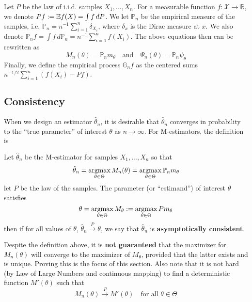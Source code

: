 \documentclass{article}
\begin{document}
Let $P$ be the law of i.i.d. samples $X_1, ..., X_n$. For a measurable function $f: \mathcal{X} \to \mathbb{R}$, we denote $Pf := \mathbb{E} f(X) = \int f\, dP$. We let $\mathbb{P}_n$ be the empirical measure of the samples, i.e. $\mathbb{P}_n = n^{-1} \sum_{i=1}^{n} \delta_{X_i}$, where $\delta_x$ is the Dirac measure at $x$. We also denote $\mathbb{P}_n f = \int f\, d\mathbb{P}_n = n^{-1} \sum_{i=1}^{n} f(X_i)$. The above equations then can be rewritten as 
\begin{equation}
    M_n(\theta) = \mathbb{P}_n m_\theta \quad \text{and} \quad \Psi_n(\theta) = \mathbb{P}_n \psi_\theta
\end{equation}
Finally, we define the empirical process $\mathbb{G}_n f$ as the centered sums $n^{-1/2} \sum_{i=1}^n \left( f(X_i) - Pf \right)$.

\subsection{Consistency}
When we design an estimator $\hat \theta_n$, it is desirable that $\hat \theta_n$ converges in probability to the ``true parameter'' of interest $\theta$ as $n \to \infty$. For M-estimators, the definition is
\begin{definition}
    Let $\hat \theta_n$ be the M-estimator for samples $X_1, ..., X_n$ so that 
    \begin{equation}
        \hat \theta_n = \mathop{\mathrm{argmax}}_{\theta \in \Theta} M_n(\theta) = \mathop{\mathrm{argmax}}_{\theta \in \Theta} \mathbb{P}_n m_\theta
    \end{equation}
    let $P$ be the law of the samples. The parameter (or ``estimand'') of interest $\theta$ satisfies
    \begin{equation}
        \theta = \mathop{\mathrm{argmax}}_{\theta \in \Theta} M_\theta := \mathop{\mathrm{argmax}}_{\theta \in \Theta} P m_\theta
    \end{equation}
    then if for all values of $\theta$, $\hat \theta_n \xrightarrow{P} \theta$, we say that $\hat \theta_n$ is \textbf{asymptotically consistent}.
\end{definition} 
Despite the definition above, it is \textbf{not guaranteed} that the maximizer for $M_n(\theta)$ will converge to the maximizer of $M_\theta$, provided that the latter exists and is unique. Proving this is the focus of this section. Also note that it is not hard (by Law of Large Numbers and continuous mapping) to find a deterministic function $M'(\theta)$ such that
\begin{equation}
    \label{eq:point_conv}
    M_n(\theta) \xrightarrow{P} M'(\theta) \quad \text{for all } \theta \in \Theta
\end{equation}
\end{document}
